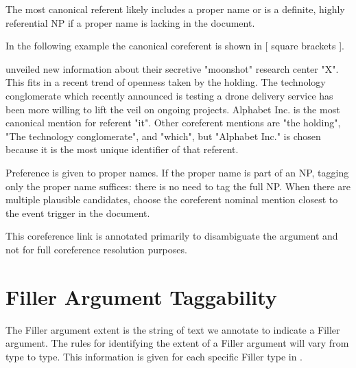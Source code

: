 The most canonical referent likely includes a proper name or is a definite, highly referential NP if a proper name is lacking in the document.

In the following example the canonical coreferent is shown in [ square brackets ].
\begin{exe}
     unveiled new information about their secretive "moonshot" research center "X". This fits in a recent trend of openness taken by the holding. The technology conglomerate which recently announced  is testing a drone delivery service has been more willing to lift the veil on ongoing projects.
        \expl Alphabet Inc. is the most canonical mention for referent "it". Other coreferent mentions are "the holding", "The technology conglomerate", and "which", but "Alphabet Inc." is chosen because it is the most unique identifier of that referent.
\end{exe}

Preference is given to proper names.
If the proper name is part of an NP, tagging only the proper name suffices: there is no need to tag the full NP.
When there are multiple plausible candidates, choose the coreferent nominal mention closest to the event trigger in the document.

This coreference link is annotated primarily to disambiguate the argument and not for full coreference resolution purposes.

 
\section{Filler Argument Taggability}
The Filler argument extent is the string of text we annotate to indicate a Filler argument.
The rules for identifying the extent of a Filler argument will vary from type to type.
This information is given for each specific Filler type in .


